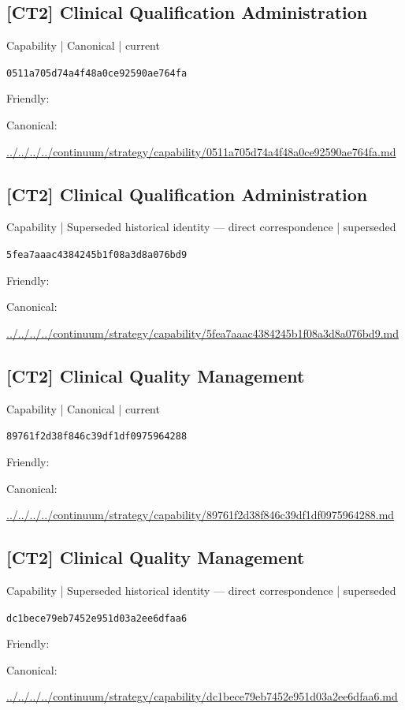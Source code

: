 \documentclass[10pt,a4paper]{article}
\begin{document}
\subsection*{[CT2] Clinical Qualification Administration}
{\small Capability | Canonical | current}\par
\texttt{0511a705d74a4f48a0ce92590ae764fa}\par
Friendly: \par
Canonical: \par
{\footnotesize\url{../../../../continuum/strategy/capability/0511a705d74a4f48a0ce92590ae764fa.md}}\par
\subsection*{[CT2] Clinical Qualification Administration}
{\small Capability | Superseded historical identity — direct correspondence | superseded}\par
\texttt{5fea7aaac4384245b1f08a3d8a076bd9}\par
Friendly: \par
Canonical: \par
{\footnotesize\url{../../../../continuum/strategy/capability/5fea7aaac4384245b1f08a3d8a076bd9.md}}\par
\subsection*{[CT2] Clinical Quality Management}
{\small Capability | Canonical | current}\par
\texttt{89761f2d38f846c39df1df0975964288}\par
Friendly: \par
Canonical: \par
{\footnotesize\url{../../../../continuum/strategy/capability/89761f2d38f846c39df1df0975964288.md}}\par
\subsection*{[CT2] Clinical Quality Management}
{\small Capability | Superseded historical identity — direct correspondence | superseded}\par
\texttt{dc1bece79eb7452e951d03a2ee6dfaa6}\par
Friendly: \par
Canonical: \par
{\footnotesize\url{../../../../continuum/strategy/capability/dc1bece79eb7452e951d03a2ee6dfaa6.md}}\par
\end{document}

